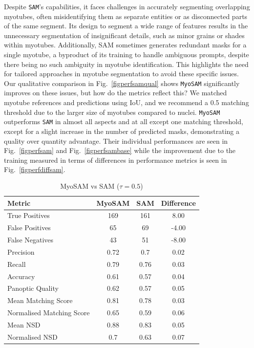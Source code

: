 Despite \texttt{SAM}'s capabilities, it faces challenges in accurately segmenting overlapping myotubes, often misidentifying them as separate entities or as disconnected parts of the same segment. Its design to segment a wide range of features results in the unnecessary segmentation of insignificant details, such as minor grains or shades within myotubes. Additionally, SAM sometimes generates redundant masks for a single myotube, a byproduct of its training to handle ambiguous prompts, despite there being no such ambiguity in myotube identification. This highlights the need for tailored approaches in myotube segmentation to avoid these specific issues. Our qualitative comparison in Fig.~\ref{figperfsamqual} shows \texttt{MyoSAM} significantly improves on these issues, but how do the metrics reflect this? We matched myotube references and predictions using IoU, and we recommend a 0.5 matching threshold due to the larger size of myotubes compared to nuclei. \texttt{MyoSAM} outperforms \texttt{SAM} in almost all aspects and at all except one matching threshold, except for a slight increase in the number of predicted masks, demonstrating a quality over quantity advantage. Their individual performances are seen in Fig.~\ref{figperfsam} and Fig.~\ref{figperfsambase} while the improvement due to the training measured in terms of differences in performance metrics is seen in Fig.~\ref{figperfdiffsam}.
\begin{table}[H]
	\centering
	\caption{MyoSAM vs SAM ($\tau = 0.5$)}
	\begin{tabular}{|l|c|c|c|}
		\hline
		Metric & MyoSAM & SAM & Difference \\
		\hline
		True Positives & 169 & 161 & 8.00 \\
		\hline
		False Positives & 65 & 69 & -4.00 \\
		\hline
		False Negatives & 43 & 51 & -8.00 \\
		\hline
		Precision & 0.72 & 0.7 & 0.02 \\
		\hline
		Recall & 0.79 & 0.76 & 0.03 \\
		\hline
		Accuracy & 0.61 & 0.57 & 0.04 \\
		\hline
		Panoptic Quality & 0.62 & 0.57 & 0.05 \\
		\hline
		Mean Matching Score & 0.81 & 0.78 & 0.03 \\
		\hline
		Normalised Matching Score & 0.65 & 0.59 & 0.06 \\
		\hline
		Mean NSD & 0.88 & 0.83 & 0.05 \\
		\hline
		Normalised NSD & 0.7 & 0.63 & 0.07 \\
		\hline
	\end{tabular}
\end{table}
